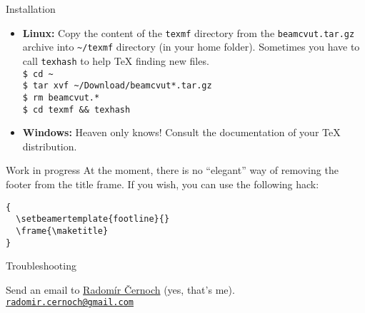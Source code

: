\documentclass{beamer}
\begin{document}
\framegraphic{}
\footergraphic{}



\begin{frame}{Installation}
\begin{itemize}
\item \textbf{Linux:} Copy the content of the \texttt{texmf}
  directory from the \texttt{beamcvut.tar.gz} archive into
  \texttt{\textasciitilde/texmf} directory (in your home folder).
  Sometimes you have to call \texttt{texhash} to help \TeX{} finding new files.\\
\texttt{\$ cd \textasciitilde}\\
\texttt{\$ tar xvf \textasciitilde/Download/beamcvut*.tar.gz}\\
\texttt{\$ rm beamcvut.*}\\
\texttt{\$ cd texmf \&\& texhash}
\item \textbf{Windows:} Heaven only knows! Consult the documentation of your \TeX{} distribution.
\end{itemize}
\end{frame}



\begin{frame}{Work in progress}
At the moment, there is no “elegant” way of removing the footer from the title frame. If you wish, you can use the following hack:

\medskip

\texttt{\{}\\
\texttt{\ \ \textbackslash{}setbeamertemplate\{footline\}\{\}}\\
\texttt{\ \ \textbackslash{}frame\{\textbackslash{}maketitle\}}\\
\texttt{\}}
\end{frame}



\begin{frame}{Troubleshooting}
\begin{center}
Send an email to \href{mailto:radomir.cernoch@gmail.com}{Radomír Černoch} (yes, that's me).
\href{mailto:radomir.cernoch@gmail.com}{\texttt{radomir.cernoch@gmail.com}}
\end{center}
\end{frame}
\end{document}
